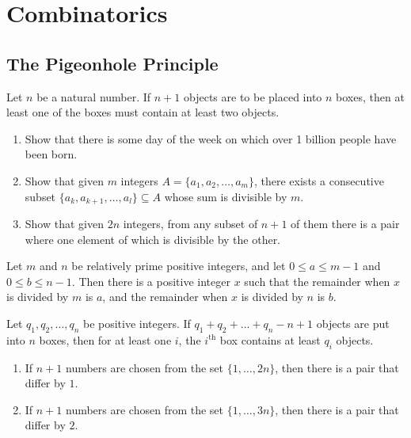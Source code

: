 \section{Combinatorics}\label{sec:combinatorics}
\subsection{The Pigeonhole Principle}
\begin{theorem} Let $n$ be a natural number.  If $n+1$ objects are to be placed into $n$ boxes, then at least one of the boxes must contain at least two objects.
\end{theorem}

\begin{examples}\begin{enumerate}
    \item Show that there is some day of the week on which over 1 billion people have been born.
    \item Show that given $m$ integers $A = \{a_1, a_2, \ldots, a_m\}$, there exists a consecutive subset $\{a_k, a_{k+1},\ldots, a_l\} \subseteq A$ whose sum is divisible by $m$.
    \item Show that given $2n$ integers, from any subset of $n+1$ of them there is a pair where one element of which is divisible by the other.
\end{enumerate}\end{examples}

\begin{theorem} Let $m$ and $n$ be relatively prime positive integers, and let $0 \leq a \leq m-1$ and $0 \leq b \leq n-1$.  Then there is a positive integer $x$ such that the remainder when $x$ is divided by $m$ is $a$, and the remainder when $x$ is divided by $n$ is $b$.
\end{theorem}

\begin{theorem} Let $q_1, q_2, \ldots, q_n$ be positive integers.  If $q_1 + q_2 + \ldots + q_n - n + 1$ objects are put into $n$ boxes, then for at least one $i$, the $i^{\text{th}}$ box contains at least $q_i$ objects.
\end{theorem}

\begin{examples} \begin{enumerate}
    \item If $n+1$ numbers are chosen from the set $\{1, \ldots, 2n\}$, then there is a pair that differ by $1$.
    \item If $n+1$ numbers are chosen from the set $\{1, \ldots, 3n\}$, then there is a pair that differ by $2$.
\end{enumerate}\end{examples}

